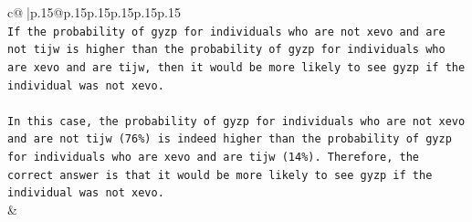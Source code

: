 \documentclass{article}
\begin{document}
{\begin{supertabular}{c@{$\;$}|p{.15\linewidth}@{}p{.15\linewidth}p{.15\linewidth}p{.15\linewidth}p{.15\linewidth}p{.15\linewidth}}
{{{\\ 
\texttt{If the probability of gyzp for individuals who are not xevo and are not tijw is higher than the probability of gyzp for individuals who are xevo and are tijw, then it would be more likely to see gyzp if the individual was not xevo. } \\
\\ 
\texttt{In this case, the probability of gyzp for individuals who are not xevo and are not tijw (76\%) is indeed higher than the probability of gyzp for individuals who are xevo and are tijw (14\%). Therefore, the correct answer is that it would be more likely to see gyzp if the individual was not xevo.} \\
            }
        }
    }
    & \\ \\

\end{supertabular}
}
\end{document}
